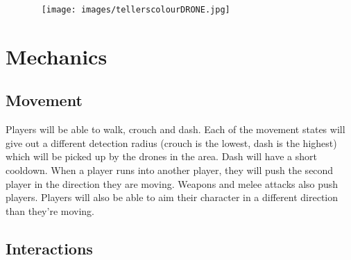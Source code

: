 \documentclass[10pt]{report}
\begin{document}
\begin{figure}[H]\
    \centering
    \texttt{[image: images/tellerscolourDRONE.jpg]}
    \caption{}
\end{figure}

\section{Mechanics}

\subsection{Movement}

Players will be able to walk, crouch and dash. Each of the movement states will give out a different detection radius (crouch is the lowest, dash is the highest) which will be picked up by the drones in the area. Dash will have a short cooldown. When a player runs into another player, they will push the second player in the direction they are moving. Weapons and melee attacks also push players. Players will also be able to aim their character in a different direction than they’re moving.

\subsection{Interactions}
\end{document}
